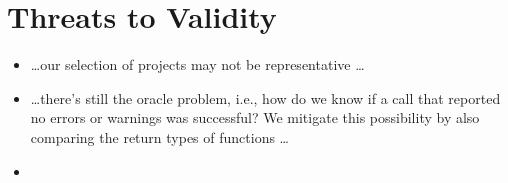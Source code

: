\section{Threats to Validity}

\begin{itemize}
    \item \ldots our selection of projects may not be representative \ldots
    \item \ldots there's still the oracle problem, i.e., how do we know if a call that reported no errors or warnings was successful? We mitigate this possibility by also comparing the return types of functions  \ldots
    \item {}
\end{itemize}